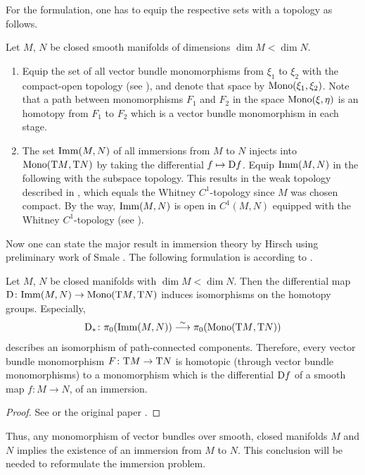 For the formulation, one has to equip the respective sets with a
topology as follows.
\begin{Def}
  Let $M$, $N$ be closed smooth manifolds of dimensions $\dim M<\dim N$.
  \begin{enumerate}
  \item
    Equip the set of all vector bundle monomorphisms from $\xi_1$ to
    $\xi_2$ with the compact-open topology (see \forexample
    \cite{hatcher}), and denote that space by $\mathrm{Mono}({\xi_1},{\xi_2})$.
    Note that a path between monomorphisms $F_1$ and $F_2$ in the
    space $\mathrm{Mono}({\xi},{\eta})$ is an homotopy from $F_1$ to $F_2$ which is
    a vector bundle monomorphism in each stage.
  \item
    The set $\mathrm{Imm}({M},{N})$ of all immersions from $M$ to $N$ injects
    into $\mathrm{Mono}({\mathrm{T}M},{\mathrm{T}N})$ by taking the differential
    $f\mapsto\mathrm{D} f$.
    Equip $\mathrm{Imm}({M},{N})$ in the following with the subspace topology.
    This results in the weak topology described in
    \cite[Section~2.1]{hirsch}, which equals the Whitney
    $C^1$-topology since $M$ was chosen compact.
    By the way, $\mathrm{Imm}({M},{N})$ is open in $C^1(M,N)$ equipped with the
    Whitney $C^1$-topology
    (see \cite[Section~2.1, Theorem~1.1]{hirsch}).
  \end{enumerate}
\end{Def}

Now one can state the major result in immersion theory by
Hirsch using preliminary work of Smale
\cite[Sections~5 and 6]{hirschimmersions}.
The following formulation is according to
\cite[Theorem~1.2]{immersionconj}.
\begin{Thm}\label{thm:hirschsmale}
  Let $M$, $N$ be closed manifolds with $\dim M<\dim N$.
  Then the differential map
  $\mathrm{D}\colon \mathrm{Imm}({M},{N})\to \mathrm{Mono}({\mathrm{T}M},{\mathrm{T}N})$
  induces isomorphisms on the homotopy groups.
  Especially,
  \begin{gather*}
    \mathrm{D}_*\colon
    \pi_0(\mathrm{Imm}({M},{N})) \overset\sim{\longrightarrow} \pi_0(\mathrm{Mono}({\mathrm{T}M},{\mathrm{T}N}))
  \end{gather*}
  describes an isomorphism of path-connected components.
  Therefore, every vector bundle monomorphism
  $F\colon\mathrm{T}M\to\mathrm{T}N$ is homotopic (through vector bundle
  monomorphisms) to a monomorphism which is the differential
  $\mathrm{D} f$ of a smooth map $f\colon M\to N$, \idest of an
  immersion.
  \begin{proof}
    See \cite[Theorem~8.2.1]{introductionhprinciple} or the original
    paper \cite{hirschimmersions}.
  \end{proof}
\end{Thm}
Thus, any monomorphism of vector bundles over smooth, closed manifolds
$M$ and $N$ implies the existence of an immersion from $M$ to $N$.
This conclusion will be needed to reformulate the immersion problem.


